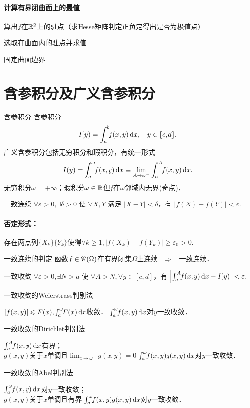 \paragraph{计算有界闭曲面上的最值}
\begin{compactenum}[(1)]
	\item 算出$f$在$\RR^2$上的驻点（求Hesse矩阵判定正负定得出是否为极值点）
	\item 选取在曲面内的驻点并求值
	\item 固定曲面边界
\end{compactenum}
\newpage
\section{含参积分及广义含参积分}
\begin{definition}{含参积分}{}
	含参积分
	\[
		I(y)=\int_a^b\bs3f(x,y)\d x,\quad y\in\zkh{c,d}.
	\]
	广义含参积分包括无穷积分和瑕积分，有统一形式
	\[
		I(y)=\int_a^\omega\bs3f(x,y)\d x\equiv\lim_{A\to\omega^-}\int_a^A\bs3f(x,y)\d x.
	\]
	无穷积分$\omega=+\infty$；瑕积分$\omega\in\RR$但$f$在$\omega$邻域内无界(奇点)．
\end{definition}
\begin{definition}{一致连续}{}
	$\forall\varepsilon>0,\exists\delta>0$ 使 $\forall X,Y$ 满足 $\vert X-Y\vert<\delta$，有 $|f(X)-f(Y)|<\varepsilon.$
	\tcblower
	\paragraph*{否定形式：}存在两点列$\{X_k\}\{Y_k\}$使得$\forall k\geqslant 1,|f(X_k)-f(Y_k)|\geqslant\varepsilon_0>0.$
\end{definition}
\begin{theorem}{一致连续的判定}{}
	函数$f\in\sC(\Omega)$在有界闭集$\Omega$上连续$\thus$一致连续．
\end{theorem}
\begin{definition}{一致收敛}{}
	$\forall\varepsilon>0,\exists N>a$ 使 $\forall A>N,\forall y\in[c,d]$，有 $\left|\int_a^A\bs3f(x,y)\d x-I(y)\right|<\varepsilon.$
\end{definition}
\begin{theorem}{一致收敛的Weierstrass判别法}{}
	\begin{center}
		$|f(x,y)|\leqslant F(x),\int_a^\omega\bs3F(x)\d x$收敛．
		\vthus
		$\int_a^\omega\bs3f(x,y)\d x$对$y$一致收敛．
	\end{center}
\end{theorem}
\begin{theorem}{一致收敛的Dirichlet判别法}{}
	\begin{center}
		$\int_a^A\bs3f(x,y)\d x$有界；\\
		$g(x,y)$关于$x$单调且$\lim_{x\to\omega^-}g(x,y)=0$
		\vthus
		$\int_a^\omega\bs3f(x,y)g(x,y)\d x$对$y$一致收敛．
	\end{center}
\end{theorem}
\begin{theorem}{一致收敛的Abel判别法}{}
	\begin{center}
		$\int_a^\omega\bs3f(x,y)\d x$对$y$一致收敛；\\
		$g(x,y)$关于$x$单调且有界
		\vthus
		$\int_a^\omega\bs3f(x,y)g(x,y)\d x$对$y$一致收敛．
	\end{center}
\end{theorem}
